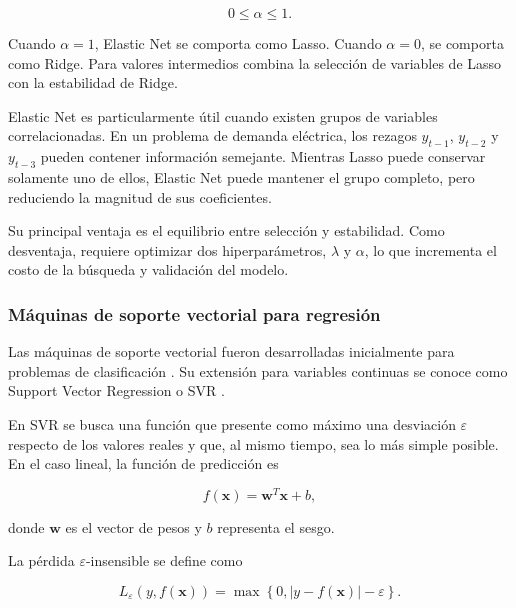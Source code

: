 \begin{equation}
    0\leq\alpha\leq 1.
\end{equation}

Cuando $\alpha=1$, Elastic Net se comporta como Lasso. Cuando $\alpha=0$, se comporta como Ridge. Para valores intermedios combina la selección de variables de Lasso con la estabilidad de Ridge.

Elastic Net es particularmente útil cuando existen grupos de variables correlacionadas. En un problema de demanda eléctrica, los rezagos $y_{t-1}$, $y_{t-2}$ y $y_{t-3}$ pueden contener información semejante. Mientras Lasso puede conservar solamente uno de ellos, Elastic Net puede mantener el grupo completo, pero reduciendo la magnitud de sus coeficientes.

Su principal ventaja es el equilibrio entre selección y estabilidad. Como desventaja, requiere optimizar dos hiperparámetros, $\lambda$ y $\alpha$, lo que incrementa el costo de la búsqueda y validación del modelo.

\subsubsection{Máquinas de soporte vectorial para regresión}
\label{sec:svr}

Las máquinas de soporte vectorial fueron desarrolladas inicialmente para problemas de clasificación \cite{cortes1995support}. Su extensión para variables continuas se conoce como Support Vector Regression o SVR \cite{drucker1997svr}.

En SVR se busca una función que presente como máximo una desviación $\varepsilon$ respecto de los valores reales y que, al mismo tiempo, sea lo más simple posible. En el caso lineal, la función de predicción es

\begin{equation}
    f(\mathbf{x})
    =
    \mathbf{w}^{T}\mathbf{x}+b,
\end{equation}

donde $\mathbf{w}$ es el vector de pesos y $b$ representa el sesgo.

La pérdida $\varepsilon$-insensible se define como

\begin{equation}
    L_{\varepsilon}(y,f(\mathbf{x}))
    =
    \max
    \left\{
        0,
        \left|
            y-f(\mathbf{x})
        \right|
        -
        \varepsilon
    \right\}.
\end{equation}


